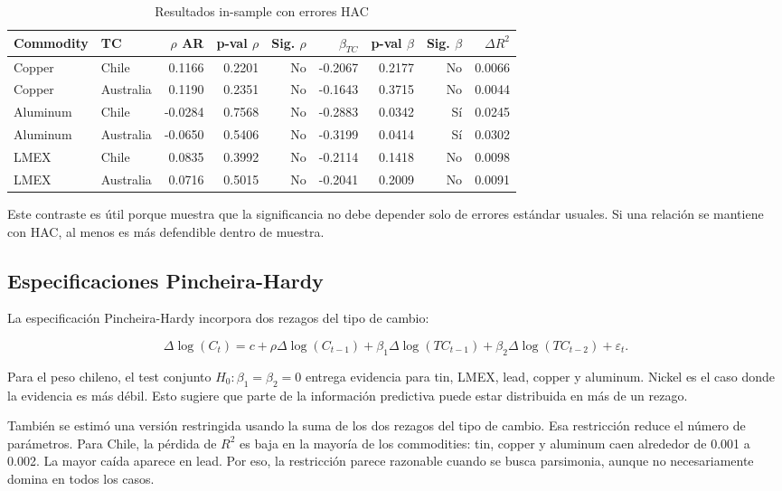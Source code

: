 \documentclass[11pt,a4paper]{article}
\begin{document}
\begin{table}[H]
\centering
\caption{Resultados in-sample con errores HAC}
\scriptsize
\begin{tabular}{llrrrrrrr}
\toprule
Commodity & TC & $\rho$ AR & p-val $\rho$ & Sig. $\rho$ & $\beta_{TC}$ & p-val $\beta$ & Sig. $\beta$ & $\Delta R^2$ \\
\midrule
Copper & Chile & 0.1166 & 0.2201 & No & -0.2067 & 0.2177 & No & 0.0066 \\
Copper & Australia & 0.1190 & 0.2351 & No & -0.1643 & 0.3715 & No & 0.0044 \\
Aluminum & Chile & -0.0284 & 0.7568 & No & -0.2883 & 0.0342 & Sí & 0.0245 \\
Aluminum & Australia & -0.0650 & 0.5406 & No & -0.3199 & 0.0414 & Sí & 0.0302 \\
LMEX & Chile & 0.0835 & 0.3992 & No & -0.2114 & 0.1418 & No & 0.0098 \\
LMEX & Australia & 0.0716 & 0.5015 & No & -0.2041 & 0.2009 & No & 0.0091 \\
\bottomrule
\end{tabular}
\end{table}

Este contraste es útil porque muestra que la significancia no debe depender solo de errores estándar usuales. Si una relación se mantiene con HAC, al menos es más defendible dentro de muestra.

\subsection{Especificaciones Pincheira-Hardy}

La especificación Pincheira-Hardy incorpora dos rezagos del tipo de cambio:

\begin{equation}
\Delta \log(C_t)=c+\rho\Delta \log(C_{t-1})+\beta_1\Delta \log(TC_{t-1})+\beta_2\Delta \log(TC_{t-2})+\varepsilon_t.
\end{equation}

Para el peso chileno, el test conjunto $H_0:\beta_1=\beta_2=0$ entrega evidencia para tin, LMEX, lead, copper y aluminum. Nickel es el caso donde la evidencia es más débil. Esto sugiere que parte de la información predictiva puede estar distribuida en más de un rezago.

También se estimó una versión restringida usando la suma de los dos rezagos del tipo de cambio. Esa restricción reduce el número de parámetros. Para Chile, la pérdida de $R^2$ es baja en la mayoría de los commodities: tin, copper y aluminum caen alrededor de 0.001 a 0.002. La mayor caída aparece en lead. Por eso, la restricción parece razonable cuando se busca parsimonia, aunque no necesariamente domina en todos los casos.
\end{document}
